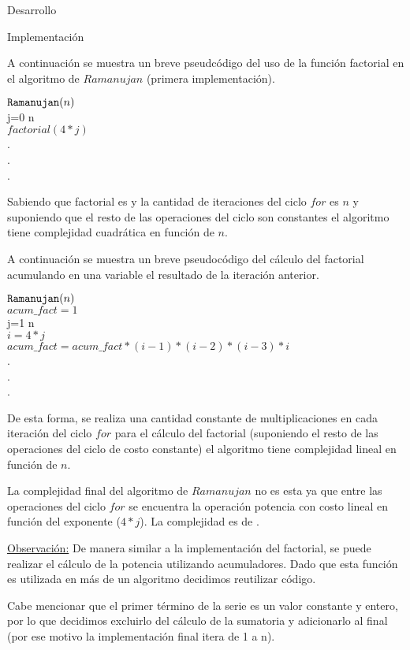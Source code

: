 \begin{section}{Desarrollo}
\begin{subsection}{Implementación}
\begin{itemize}
		A continuación se muestra un breve pseudcódigo del uso de la función factorial en el algoritmo de $Ramanujan$ (primera implementación).
		
		$\texttt{Ramanujan}(n)$\\
		\tab\FOR j=0 \TO n\\
		\tab\tab$factorial(4*j)$\\
		\tab\tab\tab.\\
		\tab\tab\tab.\\
		\tab\tab\tab.\\
		\tab\END
		
		\VSP
		
		Sabiendo que factorial es  y la cantidad de iteraciones del ciclo $for$ es $n$ y suponiendo que el resto de las operaciones del ciclo son constantes el algoritmo tiene complejidad cuadrática en función de $n$.\VSP

		A continuación se muestra un breve pseudocódigo del cálculo del factorial acumulando en una variable el resultado de la iteración anterior.\VSP
		
		$\texttt{Ramanujan}(n)$\\
		\tab $acum\_fact=1$\\
		\tab\FOR j=1 \TO n\\
		\tab\tab $i = 4*j$\\
		\tab\tab$acum\_fact = acum\_fact*(i-1)*(i-2)*(i-3)*i$\\
		\tab\tab\tab.\\
		\tab\tab\tab.\\
		\tab\tab\tab.\\
		\tab\END
		
		\VSP
		
		De esta forma, se realiza una cantidad constante de multiplicaciones en cada iteración del ciclo $for$ para el cálculo del factorial (suponiendo el resto de las operaciones del ciclo de costo constante) el algoritmo tiene complejidad lineal en función de $n$.
		
		La complejidad final del algoritmo de $Ramanujan$ no es esta ya que entre las operaciones del ciclo $for$ se encuentra la operación potencia con costo lineal en función del exponente ($4*j$). La complejidad es de .
		
		\underline{Observación:} De manera similar a la implementación del factorial, se puede realizar el cálculo de la potencia utilizando acumuladores. Dado que esta función es utilizada en más de un algoritmo decidimos reutilizar código.
		
		Cabe mencionar que el primer término de la serie es un valor constante y entero, por lo que decidimos excluirlo del cálculo de la sumatoria y adicionarlo al final (por ese motivo la implementación final itera de 1 a n).
		\end{itemize}
		

\end{subsection}
\end{section}
